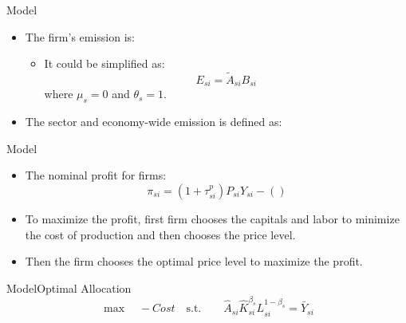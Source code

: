 \documentclass[aspectratio=169]{beamer}
\begin{document}
\begin{frame}{Model}
	\begin{itemize}
		\item The firm's emission is:
		
		\pause
		\begin{itemize}
			\item It could be simplified as:
				\begin{equation*}
					E_{si} = \tilde{A}_{si}B_{si}
				\end{equation*}
			where $\mu_s = 0$ and $\theta_s = 1$.
		\end{itemize}
		\item The sector and economy-wide emission is defined as:
			
	\end{itemize}
\end{frame}

\begin{frame}{Model}
\begin{itemize}
	\item The nominal profit for firms:
	\begin{equation}
		\pi_{si} = {(1+\tau_{si}^p) P_{si} Y_{si} - \left(\right)}
	\end{equation}
	\item To maximize the profit, first firm chooses the capitals and labor to minimize the cost of production and then chooses the price level.
	\item Then the firm chooses the optimal price level to maximize the profit.
\end{itemize}
\end{frame}

\begin{frame}{Model}{Optimal Allocation}
	\begin{equation*}
		\max  \quad
			- 		Cost \quad \text{s.t.} \quad \quad \hat{A}_{si}\hat{K}_{si}^{\beta_s} L_{si}^{1-\beta_s} = \bar{Y}_{si}
	\end{equation*}
	\begin{equation*}
	
	\end{equation*}
	\begin{equation*}
		
	\end{equation*}
	
	
\end{frame}
\end{document}
